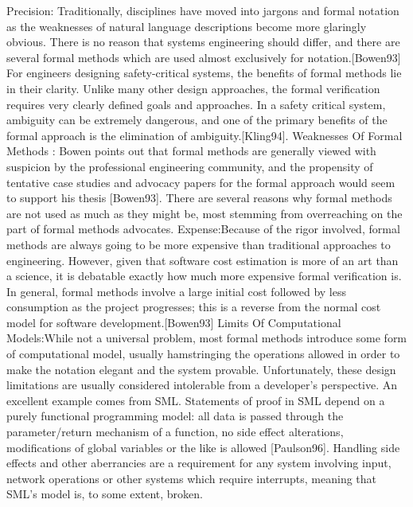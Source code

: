 Precision: Traditionally, disciplines have moved into jargons and formal notation as the weaknesses of natural language descriptions become more glaringly obvious. There is no reason that systems engineering should differ, and there are several formal methods which are used almost exclusively for notation.[Bowen93]
For engineers designing safety-critical systems, the benefits of formal methods lie in their clarity. Unlike many other design approaches, the formal verification requires very clearly defined goals and approaches. In a safety critical system, ambiguity can be extremely dangerous, and one of the primary benefits of the formal approach is the elimination of ambiguity.[Kling94].
Weaknesses Of Formal Methods
: Bowen points out that formal methods are generally viewed with suspicion by the professional engineering community, and the propensity of tentative case studies and advocacy papers for the formal approach would seem to support his thesis [Bowen93]. There are several reasons why formal methods are not used as much as they might be, most stemming from overreaching on the part of formal methods advocates.
Expense:Because of the rigor involved, formal methods are always going to be more expensive than traditional approaches to engineering. However, given that software cost estimation is more of an art than a science, it is debatable exactly how much more expensive formal verification is. In general, formal methods involve a large initial cost followed by less consumption as the project progresses; this is a reverse from the normal cost model for software development.[Bowen93]
Limits Of Computational Models:While not a universal problem, most formal methods introduce some form of computational model, usually hamstringing the operations allowed in order to make the notation elegant and the system provable. Unfortunately, these design limitations are usually considered intolerable from a developer's perspective.
An excellent example comes from SML. Statements of proof in SML depend on a purely functional programming model: all data is passed through the parameter/return mechanism of a function, no side effect alterations, modifications of global variables or the like is allowed [Paulson96]. Handling side effects and other aberrancies are a requirement for any system involving input, network operations or other systems which require interrupts, meaning that SML's model is, to some extent, broken.

